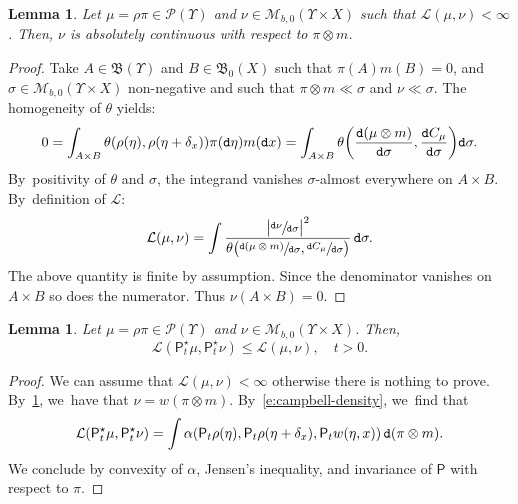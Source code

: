 \documentclass[JEP,XML,SOM,Unicode,published]{cedram}
\newtheorem{lemma}[theorem]{Lemma}
\theoremstyle{definition}
\theoremstyle{remark}
\DeclarePairedDelimiter{\paren}{\lparen}{\rparen}
\DeclarePairedDelimiter{\abs}{\lvert}{\rvert}
\begin{document}
\begin{lemma}\label{t:lagrangian-absolutely-continuous}
Let $\mu = \rho \pi \in \mathscr{P}(\varUpsilon)$ and $\nu \in \mathscr{M}_{b,0}(\varUpsilon \times X)$ such that $\mathcal{L}(\mu, \nu) < \infty$.
Then, $\nu$ is absolutely continuous with respect to $\pi \otimes m$.
\end{lemma}
\begin{proof}
Take $A \in \mathfrak{B}(\varUpsilon)$ and $B \in \mathfrak{B}_{0}(X)$ such that $\pi(A) m(B) = 0$, and $\sigma \in \mathscr{M}_{b,0}(\varUpsilon \times X)$ non-negative and such that $\pi \otimes m \ll \sigma$ and $\nu \ll \sigma$.
The homogeneity of $\theta$ yields:
\begin{equation*}
0 = \int_{A \times B} \theta(\rho(\eta), \rho(\eta + \delta_{x})) \pi(\mathtt{d} \eta) m(\mathtt{d} x) = \int_{A \times B} \theta\paren*{\frac{\mathtt{d} (\mu \otimes m)}{\mathtt{d} \sigma}, \frac{\mathtt{d} C_{\mu}}{\mathtt{d} \sigma}} \mathtt{d} \sigma.
\end{equation*}
By~positivity of $\theta$ and $\sigma$, the integrand vanishes $\sigma$-almost everywhere on $A \times B$.
By~definition of $\mathcal{L}$:
\begin{equation*}
\mathcal{L}(\mu, \nu) = \int \frac{\abs[\big]{\sfrac{\mathtt{d} \nu}{\mathtt{d} \sigma}}^{2}}{\theta\paren[\big]{\sfrac{\mathtt{d} (\mu \otimes m)}{\mathtt{d} \sigma}, \sfrac{\mathtt{d} C_{\mu}}{\mathtt{d} \sigma}}}\, \mathtt{d} \sigma.
\end{equation*}
The above quantity is finite by assumption.
Since the denominator vanishes on $A \times B$ so does the numerator.
Thus $\nu(A \times B) = 0$.
\end{proof}

\begin{lemma}\label{t:contraction-lagrangian}
Let $\mu = \rho \pi \in \mathscr{P}(\varUpsilon)$ and $\nu \in \mathscr{M}_{b,0}(\varUpsilon \times X)$.
Then,
\begin{equation*}
\mathcal{L}(\mathsf{P}^{\star}_{t}\mu, \mathsf{P}^{\star}_{t}\nu) \leq \mathcal{L}(\mu, \nu), \quad t > 0.
\end{equation*}
\end{lemma}

\begin{proof}
We can assume that $\mathcal{L}(\mu, \nu) < \infty$ otherwise there is nothing to prove.
By~\cref{t:lagrangian-absolutely-continuous}, we~have that $\nu = w (\pi \otimes m)$.
By~\cref{e:campbell-density}, we~find that
\begin{equation*}
\mathcal{L}(\mathsf{P}^{\star}_{t}\mu, \mathsf{P}^{\star}_{t} \nu) = \int \alpha\paren*{\mathsf{P}_{t} \rho(\eta), \mathsf{P}_{t} \rho(\eta + \delta_{x}), \mathsf{P}_t w(\eta, x)} \, \mathtt{d} (\pi \otimes m).
\end{equation*}
We conclude by convexity of $\alpha$, Jensen's inequality, and invariance of $\mathsf{P}$ with respect to $\pi$.
\end{proof}
\end{document}
